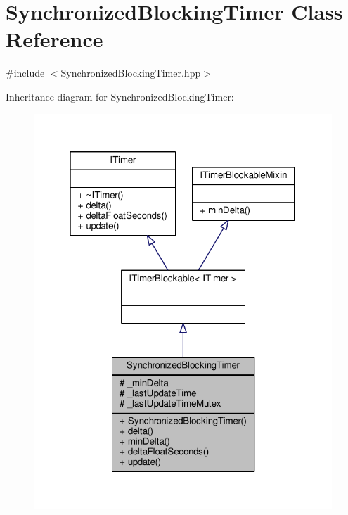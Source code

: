 \hypertarget{class_synchronized_blocking_timer}{\section{Synchronized\-Blocking\-Timer Class Reference}
\label{class_synchronized_blocking_timer}
}


{\ttfamily \#include $<$Synchronized\-Blocking\-Timer.\-hpp$>$}



Inheritance diagram for Synchronized\-Blocking\-Timer\-:
\nopagebreak
\begin{figure}[H]
\begin{center}
\leavevmode
\includegraphics[width=321pt]{class_synchronized_blocking_timer__inherit__graph}
\end{center}
\end{figure}


